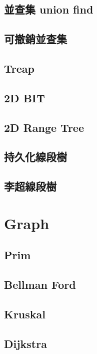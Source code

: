 \subsection{並查集 union find}

\subsection{可撤銷並查集}

\subsection{Treap}

\subsection{2D BIT}

\subsection{2D Range Tree}

\subsection{持久化線段樹}

\subsection{李超線段樹}


\section{Graph}

\subsection{Prim}

\subsection{Bellman Ford}

\subsection{Kruskal}

\subsection{Dijkstra}

